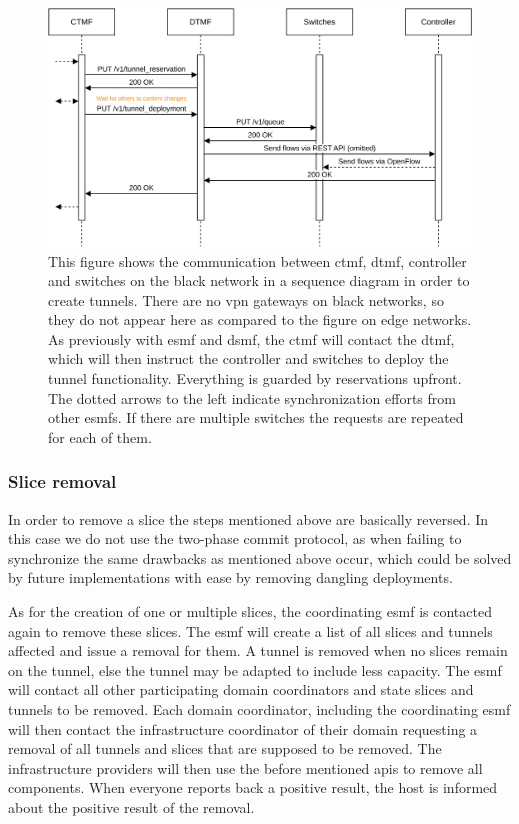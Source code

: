 \begin{figure}[H]
  \centering
  \includegraphics[width=\linewidth]{images/chapter_6/slice_creation_bn.png}
  \caption[Slice creation on a black network]{This figure shows the communication between \acrshort{ctmf}, \acrshort{dtmf}, controller and switches on the black network in a sequence diagram in order to create tunnels. There are no \acrshort{vpn} gateways on black networks, so they do not appear here as compared to the figure on edge networks. As previously with \acrshort{esmf} and \acrshort{dsmf}, the \acrshort{ctmf} will contact the \acrshort{dtmf}, which will then instruct the controller and switches to deploy the tunnel functionality. Everything is guarded by reservations upfront. The dotted arrows to the left indicate synchronization efforts from other \acrshort{esmf}s. If there are multiple switches the requests are repeated for each of them.}
  \label{fig:slice_creation_bn}
\end{figure}

\newpage

\subsubsection{Slice removal}
In order to remove a slice the steps mentioned above are basically reversed. In this case we do not use the two-phase commit protocol, as when failing to synchronize the same drawbacks as mentioned above occur, which could be solved by future implementations with ease by removing dangling deployments.

As for the creation of one or multiple slices, the coordinating \acrshort{esmf} is contacted again to remove these slices. The \acrshort{esmf} will create a list of all slices and tunnels affected and issue a removal for them. A tunnel is removed when no slices remain on the tunnel, else the tunnel may be adapted to include less capacity. The \acrshort{esmf} will contact all other participating domain coordinators and state slices and tunnels to be removed. Each domain coordinator, including the coordinating \acrshort{esmf} will then contact the infrastructure coordinator of their domain requesting a removal of all tunnels and slices that are supposed to be removed. The infrastructure providers will then use the before mentioned \acrshort{api}s to remove all components. When everyone reports back a positive result, the host is informed about the positive result of the removal.

